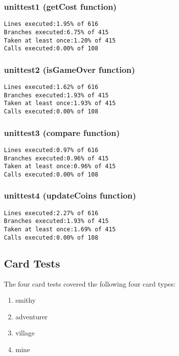 \documentclass[11pt]{article}
\begin{document}
\subsubsection{unittest1 (getCost function)}
\label{sec:unittestgetcostfunction}

\begin{verbatim}
Lines executed:1.95% of 616
Branches executed:6.75% of 415
Taken at least once:1.20% of 415
Calls executed:0.00% of 108
\end{verbatim}

\subsubsection{unittest2 (isGameOver function)}
\label{sec:unittestisgameoverfunction}

\begin{verbatim}
Lines executed:1.62% of 616
Branches executed:1.93% of 415
Taken at least once:1.93% of 415
Calls executed:0.00% of 108
\end{verbatim}

\subsubsection{unittest3 (compare function)}
\label{sec:unittestcomparefunction}

\begin{verbatim}
Lines executed:0.97% of 616
Branches executed:0.96% of 415
Taken at least once:0.96% of 415
Calls executed:0.00% of 108
\end{verbatim}

\subsubsection{unittest4 (updateCoins function)}
\label{sec:unittestupdatecoinsfunction}

\begin{verbatim}
Lines executed:2.27% of 616
Branches executed:1.93% of 415
Taken at least once:1.69% of 415
Calls executed:0.00% of 108
\end{verbatim}

\subsection{Card Tests}
\label{sec:cardtests}

The four card tests covered the following four card types:
\begin{enumerate}
\item smithy
\item adventurer
\item village
\item mine
\end{enumerate}
\end{document}
